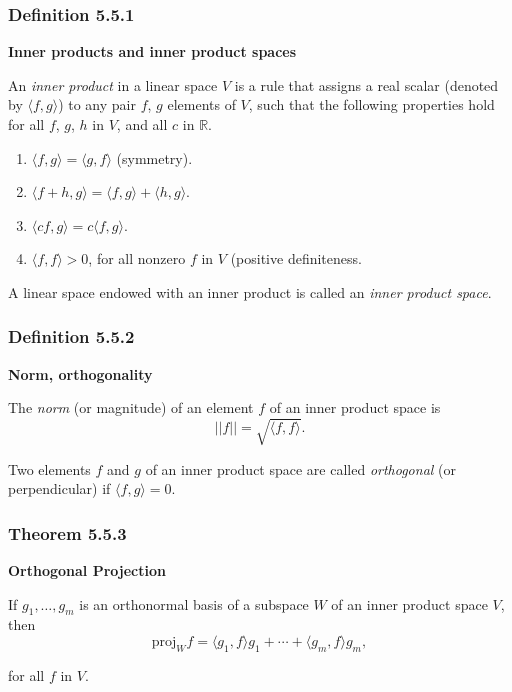 \documentclass{report}
\begin{document}
\subsubsection*{Definition 5.5.1}
\par\noindent\textbf{Inner products and inner product spaces}
\par\noindent An \textit{inner product} in a linear space $V$ is a rule that assigns a real scalar (denoted by $\langle{}f,g\rangle{}$) to any pair $f$, $g$ elements of $V$, such that the following properties hold for all $f$, $g$, $h$ in $V$, and all $c$ in $\mathbb{R}$.
\renewcommand{\labelenumi}{\textbf{\alph{enumi}.}}
\begin{enumerate}
\item $\langle{}f,g\rangle{}=\langle{}g,f\rangle{}$ (symmetry).
\item $\langle{}f+h,g\rangle{}=\langle{}f,g\rangle{}+\langle{}h,g\rangle{}$.
\item $\langle{}cf,g\rangle{}=c\langle{}f,g\rangle{}$.
\item $\langle{}f,f\rangle{}>0$, for all nonzero $f$ in $V$ (positive definiteness.
\end{enumerate}
\par\noindent A linear space endowed with an inner product is called an \textit{inner product space}.
\subsubsection*{Definition 5.5.2}
\par\noindent\textbf{Norm, orthogonality}
\par\noindent The \textit{norm} (or magnitude) of an element $f$ of an inner product space is
\[||f||=\sqrt{\langle{}f,f\rangle{}}.\]
\par\noindent Two elements $f$ and $g$ of an inner product space are called \textit{orthogonal} (or perpendicular) if $\langle{}f,g\rangle{}=0$.
\subsubsection*{Theorem 5.5.3}
\par\noindent\textbf{Orthogonal Projection}
\par\noindent If $g_{1},\ldots{},g_{m}$ is an orthonormal basis of a subspace $W$ of an inner product space $V$, then
\[\textrm{proj}_{W}f=\langle{}g_{1},f\rangle{}g_{1}+\cdots{}+\langle{}g_{m},f\rangle{}g_{m},\]
\par\noindent for all $f$ in $V$.
\end{document}
